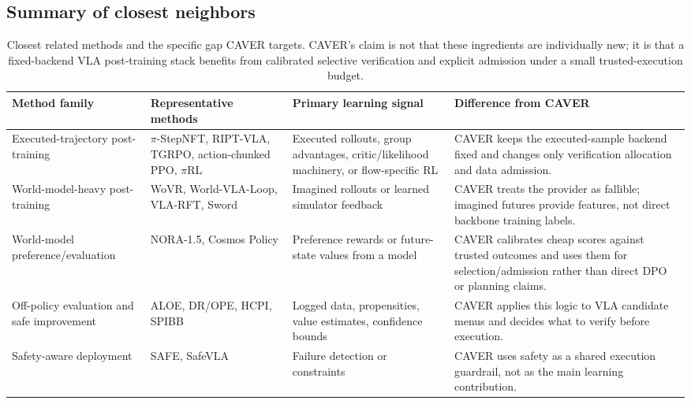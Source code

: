\documentclass[10pt]{article}
\theoremstyle{plain}
\theoremstyle{definition}
\theoremstyle{remark}
\begin{document}
\subsection{Summary of closest neighbors}
\begin{table}[H]
\centering
\small
\caption{Closest related methods and the specific gap CAVER targets. CAVER's claim is not that these ingredients are individually new; it is that a fixed-backend VLA post-training stack benefits from calibrated selective verification and explicit admission under a small trusted-execution budget.}
\begin{tabularx}{\linewidth}{@{}p{2.3cm}p{3.3cm}p{3.2cm}X@{}}
\toprule
Method family & Representative methods & Primary learning signal & Difference from CAVER \\
\midrule
Executed-trajectory post-training & $\pi$-StepNFT, RIPT-VLA, TGRPO, action-chunked PPO, $\pi$RL \citep{wang2026pistepnft,tan2025riptvla,chen2025tgrpo,wang2025actionchunkppo,chen2025pirl} & Executed rollouts, group advantages, critic/likelihood machinery, or flow-specific RL & CAVER keeps the executed-sample backend fixed and changes only verification allocation and data admission. \\
World-model-heavy post-training & WoVR, World-VLA-Loop, VLA-RFT, Sword \citep{jiang2026wovr,liu2026worldvlaloop,li2025vlarft,gao2026sword} & Imagined rollouts or learned simulator feedback & CAVER treats the provider as fallible; imagined futures provide features, not direct backbone training labels. \\
World-model preference/evaluation & NORA-1.5, Cosmos Policy \citep{hung2025nora15,kim2026cosmospolicy} & Preference rewards or future-state values from a model & CAVER calibrates cheap scores against trusted outcomes and uses them for selection/admission rather than direct DPO or planning claims. \\
Off-policy evaluation and safe improvement & ALOE, DR/OPE, HCPI, SPIBB \citep{yang2026aloe,dudik2011dr,jiang2016doubly,thomas2015hcpi,laroche2019spibb} & Logged data, propensities, value estimates, confidence bounds & CAVER applies this logic to VLA candidate menus and decides what to verify before execution. \\
Safety-aware deployment & SAFE, SafeVLA \citep{gu2025safe,zhang2025safevla} & Failure detection or constraints & CAVER uses safety as a shared execution guardrail, not as the main learning contribution. \\
\bottomrule
\end{tabularx}
\label{tab:related_work}
\end{table}
\end{document}

